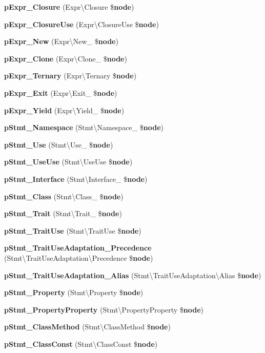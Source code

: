 \begin{DoxyCompactItemize}
\item 
{\bf p\+Expr\+\_\+\+Closure} (Expr\textbackslash{}\+Closure \${\bf node})
\item 
{\bf p\+Expr\+\_\+\+Closure\+Use} (Expr\textbackslash{}\+Closure\+Use \${\bf node})
\item 
{\bf p\+Expr\+\_\+\+New} (Expr\textbackslash{}\+New\+\_\+ \${\bf node})
\item 
{\bf p\+Expr\+\_\+\+Clone} (Expr\textbackslash{}\+Clone\+\_\+ \${\bf node})
\item 
{\bf p\+Expr\+\_\+\+Ternary} (Expr\textbackslash{}\+Ternary \${\bf node})
\item 
{\bf p\+Expr\+\_\+\+Exit} (Expr\textbackslash{}\+Exit\+\_\+ \${\bf node})
\item 
{\bf p\+Expr\+\_\+\+Yield} (Expr\textbackslash{}\+Yield\+\_\+ \${\bf node})
\item 
{\bf p\+Stmt\+\_\+\+Namespace} (Stmt\textbackslash{}\+Namespace\+\_\+ \${\bf node})
\item 
{\bf p\+Stmt\+\_\+\+Use} (Stmt\textbackslash{}\+Use\+\_\+ \${\bf node})
\item 
{\bf p\+Stmt\+\_\+\+Use\+Use} (Stmt\textbackslash{}\+Use\+Use \${\bf node})
\item 
{\bf p\+Stmt\+\_\+\+Interface} (Stmt\textbackslash{}\+Interface\+\_\+ \${\bf node})
\item 
{\bf p\+Stmt\+\_\+\+Class} (Stmt\textbackslash{}\+Class\+\_\+ \${\bf node})
\item 
{\bf p\+Stmt\+\_\+\+Trait} (Stmt\textbackslash{}\+Trait\+\_\+ \${\bf node})
\item 
{\bf p\+Stmt\+\_\+\+Trait\+Use} (Stmt\textbackslash{}\+Trait\+Use \${\bf node})
\item 
{\bf p\+Stmt\+\_\+\+Trait\+Use\+Adaptation\+\_\+\+Precedence} (Stmt\textbackslash{}\+Trait\+Use\+Adaptation\textbackslash{}\+Precedence \${\bf node})
\item 
{\bf p\+Stmt\+\_\+\+Trait\+Use\+Adaptation\+\_\+\+Alias} (Stmt\textbackslash{}\+Trait\+Use\+Adaptation\textbackslash{}\+Alias \${\bf node})
\item 
{\bf p\+Stmt\+\_\+\+Property} (Stmt\textbackslash{}\+Property \${\bf node})
\item 
{\bf p\+Stmt\+\_\+\+Property\+Property} (Stmt\textbackslash{}\+Property\+Property \${\bf node})
\item 
{\bf p\+Stmt\+\_\+\+Class\+Method} (Stmt\textbackslash{}\+Class\+Method \${\bf node})
\item 
{\bf p\+Stmt\+\_\+\+Class\+Const} (Stmt\textbackslash{}\+Class\+Const \${\bf node})

\end{DoxyCompactItemize}
